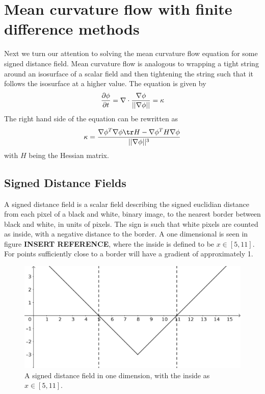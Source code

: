 \documentclass[sigconf]{acmart}
\begin{document}
\section{Mean curvature flow with finite difference methods}
Next we turn our attention to solving the mean curvature flow equation for some signed distance field. Mean curvature flow is analogous to wrapping a tight string around an isosurface of a scalar field and then tightening the string such that it follows the isosurface at a higher value. The equation is given by
\begin{equation}\label{key}
	\frac{\partial \phi}{\partial t} = \nabla \cdot \frac{\nabla \phi}{||\nabla \phi ||} = \kappa
\end{equation}
The right hand side of the equation can be rewritten as
\begin{equation}\label{key}
	\kappa = \frac{\grad \phi^T \grad \phi \tr H  - \grad\phi^T H \grad\phi}{||\grad\phi||^3}
\end{equation}
with $ H $ being the Hessian matrix.

\subsection{Signed Distance Fields}
A signed distance field is a scalar field describing the signed euclidian distance from each pixel of a black and white, binary image, to the nearest border between black and white, in units of pixels. The sign is such that white pixels are counted as inside, with a negative distance to the border. A one dimensional is seen in figure \textbf{INSERT REFERENCE}, where the inside is defined to be $ x \in [5, 11] $. For points sufficiently close to a border will have a gradient of approximately 1.
\begin{figure}
	\includegraphics[width=\linewidth]{signed_distance_1d}
	\caption{A signed distance field in one dimension, with the inside as $ x \in [5, 11] $.}
	\label{fig:signed_dist}
\end{figure}
\end{document}
